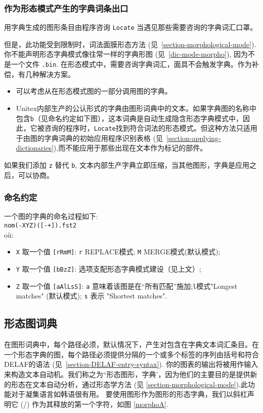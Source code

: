 \subsubsection{作为形态模式产生的字典词条出口}
用字典生成的图形条目由程序咨询 \verb+Locate+ 当遇见那些需要咨询的字典词汇口罩。

\bigskip
\noindent 但是，此功能受到限制时，词法面膜形态方法
(见~\ref{section-morphological-mode}). 你不能声明形态字典模式像往常一样的字典形图 (见~\ref{dic-mode-morpho}),
因为不是一个文件 \verb+.bin+. 在形态模式中，需要咨询字典词汇，面具不会触发字典。作为补偿，有几种解决方案。
\begin{itemize}
\item 可以考虑从在形态模式图的一部分调用图的字典。
\item Unitex内部生产的公认形式的字典由图形词典中的文本。如果字典图的名称中包含\verb+b+（见命名约定如下图），这本词典是自动生成隐含形态字典模式中，因此，它被咨询的程序时，\verb+Locate+找到符合词法的形态模式。但这种方法只适用于由图的字典词典的初始应用程序识别表格 (见~\ref{section-applying-dictionaries}),而不能应用于那些出现在文本作为标记的部件。
\end{itemize}
如果我们添加 \verb+z+ 替代  \verb+b+, 文本内部生产字典立即压缩，当其他图形，字典是应用之后，可以协商。
 
\subsubsection{命名约定}
一个图的字典的命名过程如下:\\

\verb$nom(-XYZ)([-+]).fst2$\\

\noindent où:
\begin{itemize}
\item \verb+X+ 取一个值 \verb+[rRmM]+: \verb+r+ REPLACE模式; \verb+M+
MERGE模式(默认模式);
\item \verb+Y+ 取一个值 \verb+[bBzZ]+: 选项支配形态字典模式建设（见上文）;
\item \verb+Z+ 取一个值 \verb+[aAlLsS]+: \verb+a+ 意味着该图是在“所有匹配”施加;\verb+l+模式"Longest matches" (默认模式); 
\verb+s+ 表示 "Shortest matches".
\end{itemize}


\subsection{形态图词典}
\label{section-morphological-dictionary-graphs}
在图形词典中，每个路径必须，默认情况下，产生对包含在字典文本词汇条目。在一个形态字典的图，每个路径必须提供分隔的一个或多个标签的序列由括号和符合DELAF的语法
 (见~\ref{section-DELAF-entry-syntax}).
你的图表的输出将被用作输入来构造文本自动机。我们称之为``形态图形，字典'，因为他们的主要目的是提供新的形态在文本自动分析，通过形态学方法
(见 \ref{section-morphological-mode}).此功能对于凝集语言如韩语很有用。
要使用图形作为图形的形态字典，我们以斜杠声明它 (/) 作为其释放的第一个字符，如图 \ref{morphoA}.

